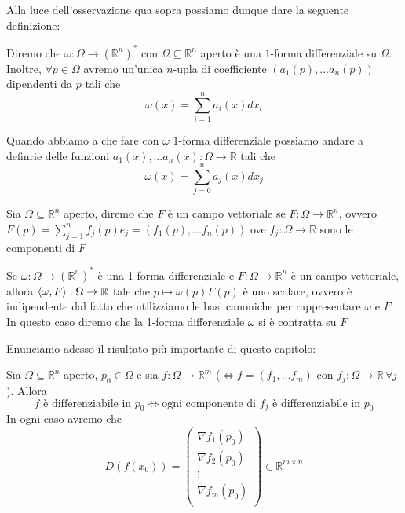 \documentclass[openany]{book}
\begin{document}
Alla luce dell'osservazione qua sopra possiamo dunque dare la seguente definizione:
\begin{definition}
Diremo che $\omega: \Omega \to (\mathbb{R}^n)^{*}$ con $\Omega \subseteq \mathbb{R}^n$ aperto è una $1$-forma differenziale su $\Omega$. Inoltre, $\forall p \in \Omega$ avremo un'unica $n$-upla di coefficiente $(a_1(p), \ldots a_n(p))$ dipendenti da $p$ tali che
$$
\omega(x) = \sum_{i=1}^n a_i(x)dx_i
$$
\end{definition}
\begin{remark}
\noindent Quando abbiamo a che fare con $\omega$ $1$-forma differenziale possiamo andare a definrie delle funzioni $a_1(x), \ldots a_n(x): \Omega \to \mathbb{R}$ tali che
$$
\omega(x) = \sum_{j=0}^n a_j(x)dx_j
$$
\end{remark}
\begin{definition}
Sia $\Omega \subseteq \mathbb{R}^n$ aperto, diremo che $F$ è un campo vettoriale se $F: \Omega \to \mathbb{R}^n$, ovvero $F(p) = \sum\limits_{j=1}^n f_j(p)e_j = (f_1(p), \ldots f_n(p))$ ove $f_j: \Omega \to \mathbb{R}$ sono le componenti di $F$
\end{definition}
\begin{remark}
Se $\omega: \Omega \to (\mathbb{R}^n)^{*}$ è una 1-forma differenziale e $F: \Omega \to \mathbb{R}^n$ è un campo vettoriale, allora $\langle \omega, F \rangle: \Omega \to \mathbb{R}$ tale che $p \mapsto \omega(p)F(p)$ è uno scalare, ovvero è indipendente dal fatto che utilizziamo le basi canoniche per rappresentare $\omega$ e $F$. In questo caso diremo che la 1-forma differenziale $\omega$ si è contratta su $F$
\end{remark}
Enunciamo adesso il risultato più importante di questo capitolo:
\begin{theorem}
Sia $\Omega \subseteq \mathbb{R}^n$ aperto, $p_0 \in \Omega$ e sia $f: \Omega \to \mathbb{R}^m$ ($\iff f=(f_1, \ldots f_m)$ con $f_j: \Omega \to \mathbb{R} \, \forall j$). Allora 
$$
f \text{ è differenziabile in } p_0 \iff \text{ogni componente di } f_j \text{ è differenziabile in } p_0
$$
In ogni caso avremo che
$$
D(f(x_0)) = \begin{pmatrix}
\nabla{f_1(p_0)} \\
\nabla{f_2(p_0)} \\
\vdots \\
\nabla{f_m(p_0)} \\
\end{pmatrix} \in \mathbb{R}^{m \times n}
$$
\end{theorem}
\end{document}
